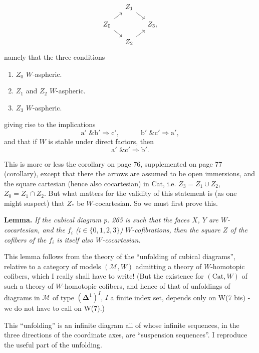 \[
\begin{tikzcd}[ampersand replacement=\&, row sep=small, column sep=small]
 \& Z_1 \arrow[dr] \& \\
Z_0 \arrow[ur] \arrow[dr] \& \& Z_3, \\
 \& Z_2 \arrow[ur] \&
\end{tikzcd}
\]
namely that the three conditions
\begin{enumerate}[label={}]
\item[a$'$)] $Z_0$ $W$-aspheric.
\item[b$'$)] $Z_1$ and $Z_2$ $W$-aspheric.
\item[c$'$)] $Z_3$ $W$-aspheric.
\end{enumerate}
giving rise to the implications
\[
\mathrm{a}' \text{ \& } \mathrm{b}' \Longrightarrow \mathrm{c}', \qquad\quad \mathrm{b}' \text{ \& } \mathrm{c}' \Longrightarrow \mathrm{a}',
\]
and that if $W$ is stable under direct factors, then
\[
\mathrm{a}' \text{ \& } \mathrm{c}' \Longrightarrow \mathrm{b}'.
\]

This is more or less the corollary on page 76, supplemented on page 77 (corollary), except that there the arrows are assumed to be open immersions, and the square cartesian (hence also cocartesian) in Cat, i.e. $Z_3 = Z_1 \cup Z_2$, $Z_0 = Z_1 \cap Z_2$. But
what matters for the validity of this statement is (as one might suspect) that $Z_*$ be $W$-cocartesian. So we must first prove this.

\textbf{Lemma.} \textit{If the cubical diagram p. 265 is such that the faces $X$, $Y$ are $W$-cocartesian, and the $f_i$ ($i \in \{0,1,2,3\}$) $W$-cofibrations, then the square $Z$ of the cofibers of the $f_i$ is itself also $W$-cocartesian.}

This lemma follows from the theory of the ``unfolding of cubical diagrams'', relative to a category of models $(\mathcal{M}, W)$ admitting a theory of $W$-homotopic cofibers, which I really shall have to write! (But the existence for $(\mathrm{Cat}, W)$ of such a theory of $W$-homotopic cofibers, and hence of that of unfoldings of diagrams in $\mathcal{M}$ of type $(\boldsymbol{\Delta}^1)^I$, $I$ a finite index set, depends only on W(7 bis) - we do not have to call on W(7).)

This ``unfolding'' is an infinite diagram all of whose infinite sequences, in the three directions of the coordinate axes, are ``suspension sequences''. I reproduce the useful part of the unfolding. %